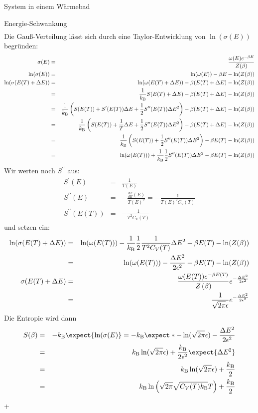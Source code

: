 \begin{chapter}{\titlestr}
\begin{section}{System in einem Wärmebad}
\begin{subsection}{Energie-Schwankung}
\begin{eqnarray*}
\end{eqnarray*}
Die Gauß-Verteilung lässt sich durch eine Taylor-Entwicklung von $\ln(\sigma(E))$ begründen:
\begin{eqnarray*}
\sigma(E)&=& \frac{\omega(E)e^{-\beta E}}{Z(\beta)}\\
\ln(\sigma(E)) &=& \ln(\omega(E))-\beta E-\ln(Z(\beta))\\
\ln(\sigma(E(T)+\Delta E)) &=& \ln(\omega(E(T)+\Delta E))-\beta (E(T)+\Delta E)-\ln(Z(\beta))\\
&=& \frac{1}{k_{\mathrm{B}} }S(E(T)+\Delta E)-\beta (E(T)+\Delta E)-\ln(Z(\beta))\\
&=& \frac{1}{k_{\mathrm{B}} }\left(S(E(T))+ S^\prime(E(T))\Delta E+\frac{1}{2}S^{\prime\prime}(E(T))\Delta E^2\right)-\beta (E(T)+\Delta E)-\ln(Z(\beta))\\
&=& \frac{1}{k_{\mathrm{B}} }\left(S(E(T))+ \frac{1}{T}\Delta E+\frac{1}{2}S^{\prime\prime}(E(T))\Delta E^2\right)-\beta (E(T)+\Delta E)-\ln(Z(\beta))\\
&=& \frac{1}{k_{\mathrm{B}} }\left(S(E(T))+\frac{1}{2}S^{\prime\prime}(E(T))\Delta E^2\right)-\beta E(T)-\ln(Z(\beta))\\
&=& \ln(\omega(E(T)))+\frac{1}{k_{\mathrm{B}} }\frac{1}{2}S^{\prime\prime}(E(T))\Delta E^2-\beta E(T)-\ln(Z(\beta))
\end{eqnarray*}
Wir werten noch $S^{\prime\prime}$ aus:
\begin{eqnarray*}
S^\prime(E) &=&\frac{1}{T(E)}\\
S^{\prime\prime}(E) &=& -\frac{\frac{dT}{dE}(E)}{T(E)^2}=-\frac{1}{T(E)^2C_V(T)}\\
S^{\prime\prime}(E(T)) &=& -\frac{1}{T^2C_V(T)}
\end{eqnarray*}
und setzen ein:
\begin{eqnarray*}
\ln(\sigma(E(T)+\Delta E)) &=& \ln(\omega(E(T)))-\frac{1}{k_{\mathrm{B}} }\frac{1}{2}\frac{1}{T^2C_V(T)}\Delta E^2-\beta E(T)-\ln(Z(\beta))\\
&=& \ln(\omega(E(T)))-\frac{\Delta E^2}{2\epsilon^2}-\beta E(T)-\ln(Z(\beta))\\
\sigma(E(T)+\Delta E) &=& \frac{\omega(E(T))e^{-\beta E(T)}}{Z\left(\beta\right)}e^{-\frac{\Delta E^2}{2\epsilon^2}}\\
&=& \frac{1}{\sqrt{2\pi}\epsilon}e^{-\frac{\Delta E^2}{2\epsilon^2}}
\end{eqnarray*}
Die Entropie wird dann
\begin{eqnarray*}
S(\beta) &=& -\kb \expect{\ln(\sigma(E)}=-\kb \expect*{-\ln(\sqrt{2\pi}\epsilon)-\frac{\Delta E^2}{2\epsilon^2}}\\
&=&\kb \ln(\sqrt{2\pi}\epsilon)+\frac{\kb }{2\epsilon^2}\expect{\Delta E^2}\\
&=&\kb \ln(\sqrt{2\pi}\epsilon)+\frac{\kb }{2}\\
&=&\kb \ln\left(\sqrt{2\pi}\sqrt{C_V(T)\kb }T\right)+\frac{\kb }{2}
\end{eqnarray*}
\end{subsection}+
\end{section}


\end{chapter}
